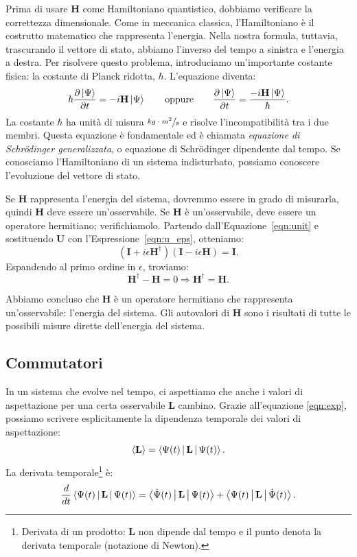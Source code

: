 Prima di usare $\mathbf{H}$ come Hamiltoniano quantistico, dobbiamo verificare la correttezza dimensionale. Come in meccanica classica, l'Hamiltoniano è il costrutto matematico che rappresenta l'energia. Nella nostra formula, tuttavia, trascurando il vettore di stato, abbiamo l'inverso del tempo a sinistra e l'energia a destra. Per risolvere questo problema, introduciamo un'importante costante fisica: la costante di Planck ridotta, $\hbar$.
L'equazione diventa:
\begin{equation}
	\label{eqn:shro}
	\hbar\frac{\partial\Ket{\Psi}}{\partial t} = - i \mathbf{H}\Ket{\Psi}
	\qquad \text{oppure} \qquad
	\frac{\partial\Ket{\Psi}}{\partial t} = \frac{- i \mathbf{H}\Ket{\Psi}}{\hbar}.
\end{equation}
La costante $\hbar$ ha unità di misura $\sfrac{kg\cdot m^2}{s}$ e risolve l'incompatibilità tra i due membri. Questa equazione è fondamentale ed è chiamata \emph{equazione di Schrödinger generalizzata}, o equazione di Schrödinger dipendente dal tempo. Se conosciamo l'Hamiltoniano di un sistema indisturbato, possiamo conoscere l'evoluzione del vettore di stato.

Se $\mathbf{H}$ rappresenta l'energia del sistema, dovremmo essere in grado di misurarla, quindi $\mathbf{H}$ deve essere un'osservabile. Se $\mathbf{H}$ è un'osservabile, deve essere un operatore hermitiano; verifichiamolo. Partendo dall'Equazione~\ref{eqn:unit} e sostituendo $\mathbf{U}$ con l'Espressione~\ref{eqn:u_eps}, otteniamo:
\[
(\mathbf{I} + i\epsilon\mathbf{H}^\dagger) (\mathbf{I} - i\epsilon\mathbf{H}) = \mathbf{I}.
\]
Espandendo al primo ordine in $\epsilon$, troviamo:
\[
\mathbf{H}^\dagger - \mathbf{H} = 0 \Rightarrow \mathbf{H}^\dagger = \mathbf{H}.
\]

Abbiamo concluso che $\mathbf{H}$ è un operatore hermitiano che rappresenta un'osservabile: l'energia del sistema. Gli autovalori di $\mathbf{H}$ sono i risultati di tutte le possibili misure dirette dell'energia del sistema. 

\subsection{Commutatori}
In un sistema che evolve nel tempo, ci aspettiamo che anche i valori di aspettazione per una certa osservabile $\mathbf{L}$ cambino. Grazie all'equazione \ref{eqn:exp}, possiamo scrivere esplicitamente la dipendenza temporale dei valori di aspettazione:
\[
\Braket{\mathbf{L}} = \Braket{\Psi(t)|\mathbf{L}|\Psi(t)}.
\]
La derivata temporale\footnote{Derivata di un prodotto: $\mathbf{L}$ non dipende dal tempo e il punto denota la derivata temporale (notazione di Newton).} è:
\[
\frac{d}{dt}\Braket{\Psi(t)|\mathbf{L}|\Psi(t)} = \Braket{\dot{\Psi}(t)|\mathbf{L}|\Psi(t)} + \Braket{\Psi(t)|\mathbf{L}|\dot{\Psi}(t)}.
\]

